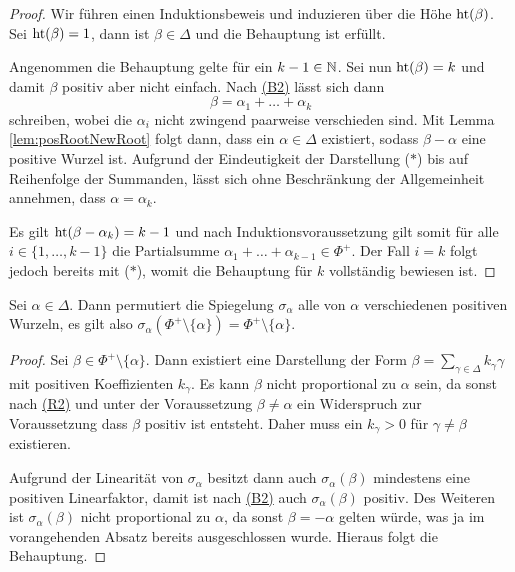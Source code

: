 \begin{proof}
  Wir führen einen Induktionsbeweis und induzieren über die Höhe $\operatorname{ht}(\beta)$.
  Sei $\operatorname{ht}(\beta) = 1$, dann ist $\beta \in \Delta$ und die Behauptung ist erfüllt.

  Angenommen die Behauptung gelte für ein $k-1 \in \mathbb{N}$.
  Sei nun $\operatorname{ht}(\beta) = k$ und damit $\beta$ positiv aber nicht einfach.
  Nach \hyperref[it:B2]{(B2)} lässt sich dann 
  \begin{displaymath}
    \beta = \alpha_1 + \dots + \alpha_k \tag{$\ast$}
  \end{displaymath}
  schreiben, wobei die $\alpha_i$ nicht zwingend paarweise verschieden sind.
  Mit Lemma \ref{lem:posRootNewRoot} folgt dann, dass ein $\alpha \in \Delta$ existiert, sodass $\beta - \alpha$ eine positive Wurzel ist.
  Aufgrund der Eindeutigkeit der Darstellung ($\ast$) bis auf Reihenfolge der Summanden, lässt sich ohne Beschränkung der Allgemeinheit annehmen, dass $\alpha = \alpha_k$.

  Es gilt $\operatorname{ht}(\beta - \alpha_{k}) = k - 1$ und nach Induktionsvoraussetzung gilt 
  somit für alle $i \in \{1,\dots,k-1\}$ die Partialsumme $\alpha_1 + \dots + \alpha_{k-1} \in \Phi^+$.
  Der Fall $i = k$ folgt jedoch bereits mit ($\ast$), womit die Behauptung für $k$ vollständig bewiesen ist.
\end{proof}

\begin{lem}
  \label{lem:permute}
  Sei $\alpha \in \Delta$. 
  Dann permutiert die Spiegelung $\sigma_\alpha$ alle von $\alpha$ verschiedenen positiven Wurzeln, es gilt also $\sigma_\alpha(\Phi^+ \setminus \{\alpha\}) = \Phi^+ \setminus \{\alpha\}$.
\end{lem}

\begin{proof}
  Sei $\beta \in \Phi^+ \setminus \{\alpha\}$. 
  Dann existiert eine Darstellung der Form $\beta = \sum_{\gamma \in \Delta} k_\gamma \gamma$ mit positiven Koeffizienten $k_\gamma$.
  Es kann $\beta$ nicht proportional zu $\alpha$ sein, da sonst nach \hyperref[it:R2]{(R2)} und unter der Voraussetzung $\beta \neq \alpha$ ein Widerspruch zur Voraussetzung dass $\beta$ positiv ist entsteht.
  Daher muss ein $k_\gamma > 0$ für $\gamma \neq \beta$ existieren.

  Aufgrund der Linearität von $\sigma_\alpha$ besitzt dann auch $\sigma_\alpha(\beta)$ mindestens eine positiven Linearfaktor, damit ist nach \hyperref[it:B2]{(B2)} auch $\sigma_\alpha(\beta)$ positiv.
  Des Weiteren ist $\sigma_\alpha(\beta)$ nicht proportional zu $\alpha$, da sonst $\beta = -\alpha$ gelten würde, was ja im vorangehenden Absatz bereits ausgeschlossen wurde.
  Hieraus folgt die Behauptung.
\end{proof}

